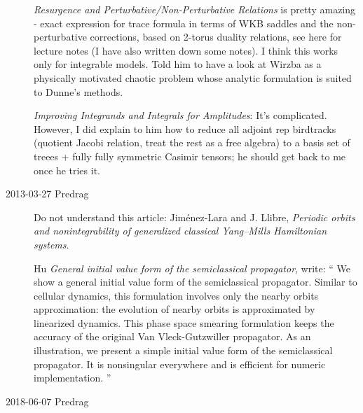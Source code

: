 \begin{description}
{\em Resurgence and Perturbative/Non-Perturbative Relations} is pretty
amazing - exact expression for trace formula in terms of WKB saddles and
the non-perturbative corrections, based on 2-torus duality relations, see
{here} for lecture notes (I have also written down some notes). I think
this works only for integrable models. Told him to have a look at
Wirzba as a physically motivated chaotic problem whose
analytic formulation is suited to Dunne's methods.

{\em Improving Integrands and Integrals for Amplitudes}: It's
complicated. However, I did explain to him how to reduce all adjoint rep
birdtracks (quotient Jacobi relation, treat the rest as a free algebra)
to a basis set of treees + fully fully symmetric Casimir tensors; he
should get back to me once he tries it.

\item[2013-03-27  Predrag] Do not understand this article:
Jim\'enez-Lara and J. Llibre,
{\em Periodic orbits and nonintegrability of generalized
classical {Yang--Mills Hamiltonian} systems}.

Hu
{\em General initial value form of the semiclassical propagator},
write: ``
We show a general initial value form of the semiclassical propagator.
Similar to cellular dynamics, this formulation involves only the
nearby orbits approximation: the evolution of nearby orbits is
approximated by linearized dynamics. This phase space smearing
formulation keeps the accuracy of the original Van Vleck-Gutzwiller
propagator. As an illustration, we present a simple initial value
form of the semiclassical propagator. It is nonsingular everywhere
and is efficient for numeric implementation.
''

\item[2018-06-07 Predrag]


\end{description}
